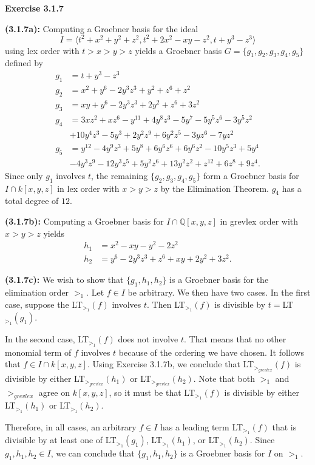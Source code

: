 \documentclass[12pt,oneside]{article}
\newenvironment{exercise}[1]{\vspace{.1in}\noindent\textbf{Exercise #1 \hspace{.05em}}}{}
\newcommand{\Q}{\mathbb{Q}}
\begin{document}
\begin{exercise}{3.1.7}
    
    \bigskip
    \textbf{(3.1.7a):}
    Computing a Groebner basis for the ideal 
    \[
        I = \langle t^2+x^2+y^2+z^2,t^2+2x^2-xy-z^2,t+y^3-z^3 \rangle    
    \]
    using lex order with $t > x > y > z$ yields a Groebner basis 
    $G = \{g_1,g_2,g_3,g_4,g_5\}$ defined by 
    \begin{align*}
        g_1 &= t+y^3-z^3\\
        g_2 &= x^2+y^6-2y^3z^3+y^2+z^6+z^2\\
        g_3 &= xy+y^6-2y^3z^3+2y^2+z^6+3z^2\\
        g_4 &= 3xz^2+xz^6-y^{11}+4y^8z^3-5y^7-5y^5z^6-3y^5z^2\\
            &+10y^4z^3-5y^3+2y^2z^9+6y^2z^5-3yz^6-7yz^2\\
        g_5 &= y^{12}-4y^9z^3+5y^8+6y^6z^6+6y^6z^2-10y^5z^3+5y^4\\
            &-4y^3z^9-12y^3z^5+5y^2z^6+13y^2z^2+z^{12}+6z^8+9z^4.
    \end{align*}
    Since only $g_1$ involves $t$, the remaining $\{g_2,g_3,g_4,g_5\}$ form 
    a Groebner basis for $I \cap k[x,y,z]$ in lex order with $x>y>z$ by 
    the Elimination Theorem. $g_4$ has a total degree of $12$.
        
    \bigskip
    \textbf{(3.1.7b):}
    Computing a Groebner basis for $I \cap \Q[x,y,z]$ in grevlex order with 
    $x>y>z$ yields 
    \begin{align*}
        h_1 &= x^2-xy-y^2-2z^2\\
        h_2 &= y^6-2y^3z^3+z^6+xy+2y^2+3z^2.
    \end{align*}
        
    \bigskip
    \textbf{(3.1.7c):}
    We wish to show that $\{g_1,h_1,h_2\}$ is a Groebner basis for the elimination 
    order $>_1$. Let $f \in I$ be arbitrary. We then have two cases. In the first case,
    suppose the LT$_{>_1}(f)$ involves $t$. Then LT$_{>_1}(f)$ is divisible by 
    $t=$LT$_{>_1}(g_1)$. 
    
    In the second case, LT$_{>_1}(f)$ does not involve $t$. 
    That means that no other monomial term of $f$ involves $t$ because of the 
    ordering we have chosen. It follows that $f \in I \cap k[x,y,z]$. Using 
    Exercise 3.1.7b, we conclude that LT$_{>_{grevlex}}(f)$ is divisible by 
    either LT$_{>_{grevlex}}(h_1)$ or LT$_{>_{grevlex}}(h_2)$. Note that both 
    $>_1$ and $>_{grevlex}$ agree on $k[x,y,z]$, so it must be that 
    LT$_{>_1}(f)$ is divisible by either LT$_{>_1}(h_1)$ or LT$_{>_1}(h_2)$. 

    Therefore, in all cases, an arbitrary $f \in I$ has a leading term 
    LT$_{>_1}(f)$ that is divisible by at least one of LT$_{>_1}(g_1)$, 
    LT$_{>_1}(h_1)$, or LT$_{>_1}(h_2)$. Since $g_1, h_1, h_2 \in I$, we 
    can conclude that $\{g_1,h_1,h_2\}$ is a Groebner basis for $I$ on 
    $>_1$.
    
\end{exercise}


\end{document}
